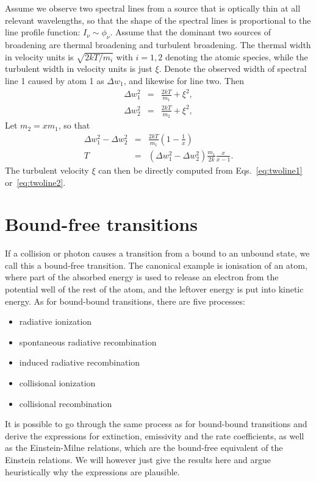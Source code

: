 \documentclass[12pt]{article}
\numberwithin{equation}{section}
\def\Inu{\ensuremath{I_{\nu}}}
\newcommand{\bea}{\begin{eqnarray}}
\newcommand{\eea}{\end{eqnarray}}
\begin{document}
Assume we observe two spectral lines from a source that is optically thin at all relevant wavelengths, so that the shape of the spectral lines is proportional to the line profile function: $\Inu \sim \phi_\nu$. Assume that the dominant two sources of broadening are thermal broadening and turbulent broadening. The thermal width in velocity units is $\sqrt{2kT/m_i}$ with $i=1,2$ denoting the atomic species, while the turbulent width in velocity units is just $\xi$. Denote the observed width of spectral line 1 caused by atom 1 as $\Delta w_1$, and likewise for line two. Then
\bea
\Delta w^2_1 &=& \frac{2kT}{m_1} + \xi^2, \label{eq:twoline1} \\
\Delta w^2_2 &=& \frac{2kT}{m_2} + \xi^2, \label{eq:twoline2}
\eea
Let $m_2 = x m_1$, so that
\bea
\Delta w^2_1 - \Delta w^2_2 &=&  \frac{2kT}{m_1} \left( 1 - \frac{1}{x} \right) \\
 T &=& \left( \Delta w^2_1 - \Delta w^2_2 \right) \frac{m_1}{2 k} \frac{x}{x-1}.
\eea
The turbulent velocity $\xi$ can then be directly computed from Eqs.~\ref{eq:twoline1} or~\ref{eq:twoline2}.


\section{Bound-free transitions}

If a collision or photon causes a transition from a bound to an unbound state, we call this a bound-free transition. The canonical example is ionisation of an atom, where part of the absorbed energy is used to release an electron from the potential well of the rest of the atom, and the leftover energy is put into kinetic energy. As for bound-bound transitions, there are five processes:

\begin{itemize}
\item radiative ionization
\item spontaneous radiative recombination
\item induced radiative recombination
\item collisional ionization
\item collisional recombination
\end{itemize}

It is possible to go through the same process as for bound-bound transitions and derive the expressions for extinction, emissivity and the rate coefficients, as well as the Einstein-Milne relations, which are the bound-free equivalent of the Einstein relations. We will however just give the results here and argue heuristically why the expressions are plausible.
\end{document}
